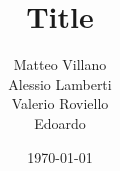\documentclass[12pt,a4paper,oneside]{article}
\title{Title}	                                    %
\author{Matteo Villano \\ Alessio Lamberti \\ Valerio Roviello \\ Edoardo}				                %
\date{\today}									    %
\theoremstyle{definition}
\begin{document}

\newpage
\tableofcontents
\newpage

\clearpage

\clearpage

\clearpage


\nocite{*}  %
\end{document}
